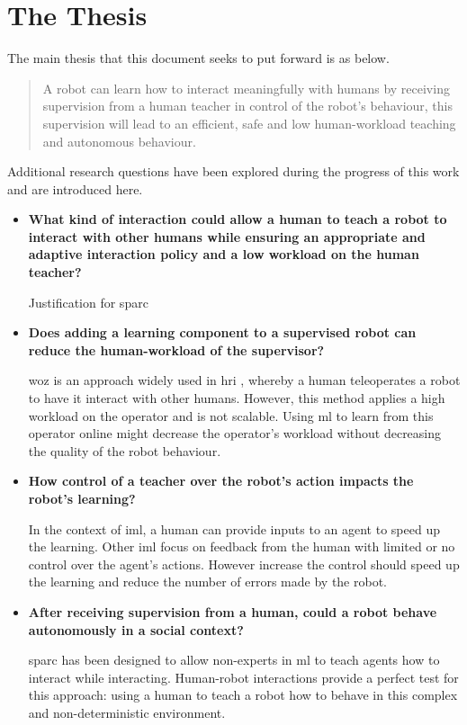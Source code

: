 \section{The Thesis}\label{sec:intro-thesis}
The main thesis that this document seeks to put forward is as below.
\begin{quote}
	A robot can learn how to interact meaningfully with humans by receiving supervision from a human teacher in control of the robot's behaviour, this supervision will lead to an efficient, safe and low human-workload teaching and autonomous behaviour.	
\end{quote}

Additional research questions have been explored during the progress of this
work and are introduced here.

\begin{itemize}
    \item \textbf{What kind of interaction could allow a human to teach a robot to interact with other humans while ensuring an appropriate and adaptive interaction policy and a low workload on the human teacher?}
    
    	Justification for \gls{sparc} 
    \item \textbf{Does adding a learning component to a supervised robot can reduce the human-workload of the supervisor?}
    
        \gls{woz} is an approach widely used in \gls{hri} \citep{riek2012wizard}, whereby a human teleoperates a robot to have it interact with other humans. However, this method applies a high workload on the operator and is not scalable. Using \gls{ml} to learn from this operator online might decrease the operator's workload without decreasing the quality of the robot behaviour.
    
    \item \textbf{How control of a teacher over the robot's action impacts the robot's learning?} 
    
	    In the context of \gls{iml}, a human can provide inputs to an agent to speed up the learning. Other \gls{iml} \citep{thomaz2008teachable,knox2009interactively} focus on feedback from the human with limited or no control over the agent's actions. However increase the control should speed up the learning and reduce the number of errors made by the robot.

    \item \textbf{After receiving supervision from a human, could a robot behave autonomously in a social context?}

	 	\gls{sparc} has been designed to allow non-experts in \gls{ml} to teach agents how to interact while interacting. Human-robot interactions provide a perfect test for this approach: using a human to teach a robot how to behave in this complex and non-deterministic environment.
	 
\end{itemize}

